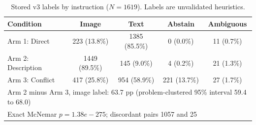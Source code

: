 \begin{table}[t]
\centering
\small
\caption{Stored v3 labels by instruction ($N=1619$). Labels are unvalidated heuristics.}
\label{tab:v3_labels}
\begin{tabular}{lcccc}
\hline
Condition & Image & Text & Abstain & Ambiguous \\
\hline
Arm 1: Direct & 223 (13.8\%) & 1385 (85.5\%) & 0 (0.0\%) & 11 (0.7\%) \\
Arm 2: Description & 1449 (89.5\%) & 145 (9.0\%) & 4 (0.2\%) & 21 (1.3\%) \\
Arm 3: Conflict & 417 (25.8\%) & 954 (58.9\%) & 221 (13.7\%) & 27 (1.7\%) \\
\hline
\multicolumn{5}{l}{Arm 2 minus Arm 3, image label: 63.7 pp (problem-clustered 95\% interval 59.4 to 68.0)} \\
\multicolumn{5}{l}{Exact McNemar $p = 1.38e-275$; discordant pairs 1057 and 25} \\
\hline
\end{tabular}
\end{table}
